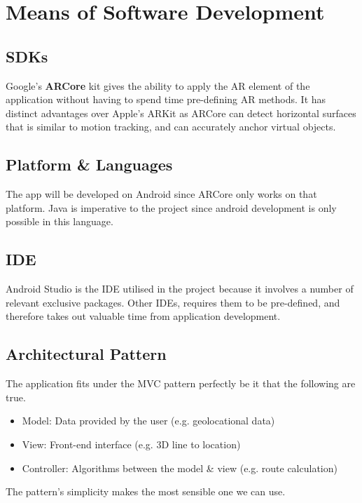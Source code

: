 
\section{Means of Software Development}

\subsection*{SDKs}
Google's \textbf{ARCore} kit gives the ability to apply the AR element of the application without having to spend time pre-defining AR methods. It has distinct advantages over Apple's ARKit as ARCore can detect horizontal surfaces that is similar to motion tracking, and can accurately anchor virtual objects. \cite{newgenapps}

\subsection*{Platform \& Languages}
The app will be developed on Android since ARCore only works on that platform. Java is imperative to the project since android development is only possible in this language.

\subsection*{IDE}
Android Studio is the IDE utilised in the project because it involves a number of relevant exclusive packages. Other IDEs, requires them to be pre-defined, and therefore takes out valuable time from application development.

\subsection*{Architectural Pattern}
The application fits under the MVC pattern perfectly be it that the following are true.
\begin{itemize}
    \item Model: Data provided by the user (e.g. geolocational data)
    \item View: Front-end interface (e.g. 3D line to location)
    \item Controller: Algorithms between the model \& view (e.g. route calculation)
\end{itemize}
The pattern's simplicity makes the most sensible one we can use.

